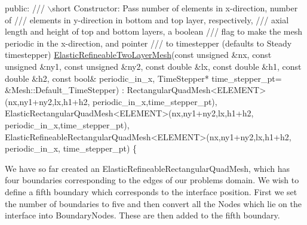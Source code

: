 \begin{DoxyCodeInclude}
\textcolor{keyword}{public}:
\textcolor{comment}{}
\textcolor{comment}{ /// \(\backslash\)short Constructor: Pass number of elements in x-direction, number of}
\textcolor{comment}{ /// elements in y-direction in bottom and top layer, respectively,}
\textcolor{comment}{ /// axial length and height of top and bottom layers, a boolean}
\textcolor{comment}{ /// flag to make the mesh periodic in the x-direction, and pointer }
\textcolor{comment}{ /// to timestepper (defaults to Steady timestepper)}
\textcolor{comment}{} \hyperlink{classElasticRefineableTwoLayerMesh}{ElasticRefineableTwoLayerMesh}(\textcolor{keyword}{const} \textcolor{keywordtype}{unsigned} &nx, 
                               \textcolor{keyword}{const} \textcolor{keywordtype}{unsigned} &ny1,
                               \textcolor{keyword}{const} \textcolor{keywordtype}{unsigned} &ny2, 
                               \textcolor{keyword}{const} \textcolor{keywordtype}{double} &lx,
                               \textcolor{keyword}{const} \textcolor{keywordtype}{double} &h1,
                               \textcolor{keyword}{const} \textcolor{keywordtype}{double} &h2,
                               \textcolor{keyword}{const} \textcolor{keywordtype}{bool}& periodic\_in\_x,
                               TimeStepper* time\_stepper\_pt=
                               &Mesh::Default\_TimeStepper)
  : RectangularQuadMesh<ELEMENT>(nx,ny1+ny2,lx,h1+h2,
                                 periodic\_in\_x,time\_stepper\_pt),
    ElasticRectangularQuadMesh<ELEMENT>(nx,ny1+ny2,lx,h1+h2,
                                        periodic\_in\_x,time\_stepper\_pt),
    ElasticRefineableRectangularQuadMesh<ELEMENT>(nx,ny1+ny2,lx,h1+h2,
                                                  periodic\_in\_x,
                                                  time\_stepper\_pt)
  \{

\end{DoxyCodeInclude}


We have so far created an {\ttfamily Elastic\+Refineable\+Rectangular\+Quad\+Mesh}, which has four boundaries corresponding to the edges of our problem\textquotesingle{}s domain. We wish to define a fifth boundary which corresponds to the interface position. First we set the number of boundaries to five and then convert all the {\ttfamily Nodes} which lie on the interface into {\ttfamily Boundary\+Nodes}. These are then added to the fifth boundary.


